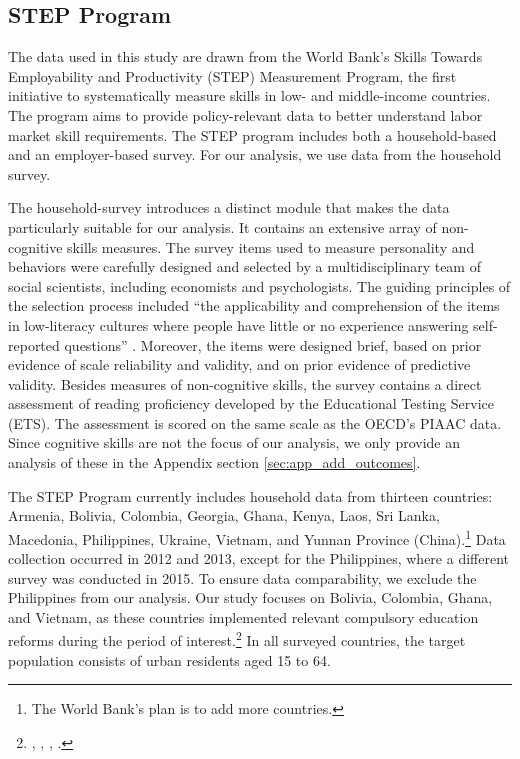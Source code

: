 \subsection{STEP Program}

The data used in this study are drawn from the World Bank’s Skills Towards Employability and Productivity (STEP) Measurement Program, the first initiative to systematically measure skills in low- and middle-income countries. The program aims to provide policy-relevant data to better understand labor market skill requirements. The STEP program includes both a household-based and an employer-based survey. For our analysis, we use data from the household survey.

The household-survey introduces a distinct module that makes the data particularly suitable for our analysis. It contains an extensive array of non-cognitive skills measures. The survey items used to measure personality and behaviors were carefully designed and selected by a multidisciplinary team of social scientists, including economists and psychologists. The guiding principles of the selection process included ``the applicability and comprehension of the items in low-literacy cultures where people have little or no experience answering self-reported questions'' \parencite[][p. 29]{pierre_step_2014}. Moreover, the items were designed brief, based on prior evidence of scale reliability and validity, and on prior evidence of predictive validity. Besides measures of non-cognitive skills, the survey contains a direct assessment of reading proficiency developed by the Educational Testing Service (ETS). The assessment is scored on the same scale as the OECD's PIAAC data. Since cognitive skills are not the focus of our analysis, we only provide an analysis of these in the Appendix section \ref{sec:app_add_outcomes}.

The STEP Program currently includes household data from thirteen countries: Armenia, Bolivia, Colombia, Georgia, Ghana, Kenya, Laos, Sri Lanka, Macedonia, Philippines, Ukraine, Vietnam, and  Yunnan Province (China).\footnote{The World Bank's plan is to add more countries.} Data collection occurred in 2012 and 2013, except for the Philippines, where a different survey was conducted in 2015. To ensure data comparability, we exclude the Philippines from our analysis. Our study focuses on Bolivia, Colombia, Ghana, and Vietnam, as these countries implemented relevant compulsory education reforms during the period of interest.\footnote{\citet{world_bank_bolivia_2012}, \citet{world_bank_colombia_2012}, \citet{world_bank_ghana_2013}, \citet{world_bank_vietnam_2012}.} In all surveyed countries, the target population consists of urban residents aged 15 to 64.


